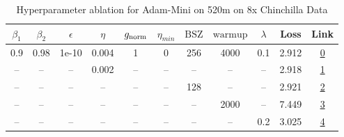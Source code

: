 \begin{table}[H]
\centering
\caption{Hyperparameter ablation for Adam-Mini on 520m on 8x Chinchilla Data}
\label{tab:ablation_adam-mini_520m_on_8x_chinchilla_data}
\begin{tabular}{ccccccccccc}
\toprule
$\beta_1$ & $\beta_2$ & $\epsilon$ & $\eta$ & $g_{\mathrm{norm}}$ & $\eta_{min}$ & $\mathrm{BSZ}$ & $\mathrm{warmup}$ & $\lambda$ & Loss & Link \\
\midrule
0.9 & 0.98 & 1e-10 & 0.004 & 1 & 0 & 256 & 4000 & 0.1 & 2.912 & \href{https://wandb.ai/marin-community/optimizer-scaling/runs/sweep-520m-85B-minidfe5aclr0.004-wd0.1-minlr0-warmup4000-b10.9-b-a76572}{0} \\
\midrule
-- & -- & -- & 0.002 & -- & -- & -- & -- & -- & 2.918 & \href{https://wandb.ai/marin-community/optimizer-scaling/runs/sweep-520m-85B-mini6bf656lr0.002-wd0.1-minlr0-warmup4000-b10.9-b-aa645d}{1} \\
-- & -- & -- & -- & -- & -- & 128 & -- & -- & 2.921 & \href{https://wandb.ai/marin-community/optimizer-scaling/runs/sweep-520m-85B-mini6698b4lr0.004-wd0.1-minlr0-warmup4000-b10.9-b-0f2989}{2} \\
-- & -- & -- & -- & -- & -- & -- & 2000 & -- & 7.449 & \href{https://wandb.ai/marin-community/optimizer-scaling/runs/sweep-520m-85B-minib765f6lr0.004-wd0.1-minlr0-warmup2000-b10.9-b-e401ae}{3} \\
-- & -- & -- & -- & -- & -- & -- & -- & 0.2 & 3.025 & \href{https://wandb.ai/marin-community/optimizer-scaling/runs/sweep-520m-85B-miniba6697lr0.004-wd0.2-minlr0-warmup4000-b10.9-b-137303}{4} \\
\bottomrule
\end{tabular}
\end{table}

